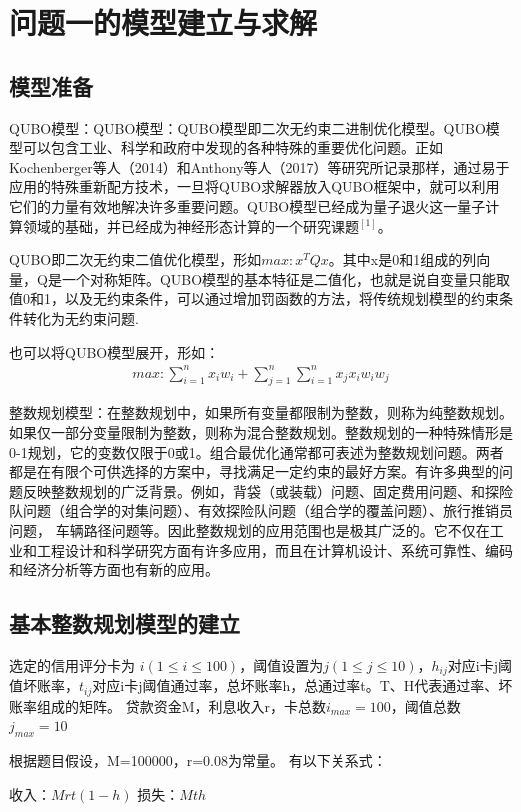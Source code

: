 \documentclass{MathorCupmodeling}
\begin{document}
	\section{问题一的模型建立与求解}
 \subsection{模型准备}
 QUBO模型：QUBO模型：QUBO模型即二次无约束二进制优化模型。QUBO模型可以包含工业、科学和政府中发现的各种特殊的重要优化问题。正如Kochenberger等人（2014）和Anthony等人（2017）等研究所记录那样，通过易于应用的特殊重新配方技术，一旦将QUBO求解器放入QUBO框架中，就可以利用它们的力量有效地解决许多重要问题。QUBO模型已经成为量子退火这一量子计算领域的基础，并已经成为神经形态计算的一个研究课题$^{[1]}$。
 
 QUBO即二次无约束二值优化模型，形如$max:x^{T}Qx$。其中x是0和1组成的列向量，Q是一个对称矩阵。QUBO模型的基本特征是二值化，也就是说自变量只能取值0和1，以及无约束条件，可以通过增加罚函数的方法，将传统规划模型的约束条件转化为无约束问题.

 也可以将QUBO模型展开，形如：
 $$
 \begin{aligned}
     max: \sum_{i=1}^{n}x_{i}w_{i}+\sum_{j=1}^{n}\sum_{i=1}^{n}x_{j}x_{i}w_{i}w_{j}
 \end{aligned}
 $$

  整数规划模型：在整数规划中，如果所有变量都限制为整数，则称为纯整数规划。如果仅一部分变量限制为整数，则称为混合整数规划。整数规划的一种特殊情形是0-1规划，它的变数仅限于0或1。组合最优化通常都可表述为整数规划问题。两者都是在有限个可供选择的方案中，寻找满足一定约束的最好方案。有许多典型的问题反映整数规划的广泛背景。例如，背袋（或装载）问题、固定费用问题、和探险队问题（组合学的对集问题）、有效探险队问题（组合学的覆盖问题）、旅行推销员问题， 车辆路径问题等。因此整数规划的应用范围也是极其广泛的。它不仅在工业和工程设计和科学研究方面有许多应用，而且在计算机设计、系统可靠性、编码和经济分析等方面也有新的应用。
  
 \subsection{基本整数规划模型的建立}
选定的信用评分卡为 $i(1 \le i \le 100)$，阈值设置为$j(1\le  j \le 10)$，$h_{ij}$对应i卡j阈值坏账率，$t_{ij}$对应i卡j阈值通过率，总坏账率h，总通过率t。T、H代表通过率、坏账率组成的矩阵。  
贷款资金M，利息收入r，卡总数$i_{max} =100$，阈值总数$j_{max}=10$  

根据题目假设，M=100000，r=0.08为常量。
有以下关系式：

收入：$Mrt(1-h)$   
损失：$Mth$  
\end{document}
